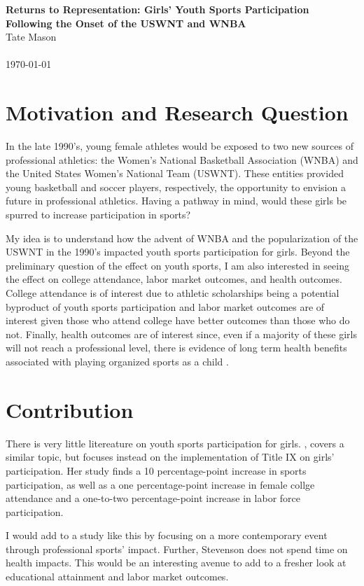 \documentclass[11pt]{article}
\newcommand{\Title}{Returns to Representation: Girls' Youth Sports Participation Following the Onset of the USWNT and WNBA}
\newcommand{\Author}{Tate Mason}
\newcommand{\Date}{\today}
\newcommand{\Section}[1]{\section{#1}}
\newcommand{\1}[1]{\mathbb{I}\{#1\}}
\theoremstyle{plain}
\begin{document}
\begin{center}
  {\large \textbf{\Title}}\\[0.5em]
  {\large \Author}\\
  {\Affil}\\[0.25em]
  {\Date}
\end{center}

\vspace{0.5em}

\Section{Motivation and Research Question}
  In the late 1990's, young female athletes would be exposed to two new sources of professional athletics:
  the Women's National Basketball Association (WNBA) and the United States Women's National Team (USWNT).
  These entities provided young basketball and soccer players, respectively, the opportunity to envision
  a future in professional athletics. Having a pathway in mind, would these girls be spurred to increase
  participation in sports?

  My idea is to understand how the advent of WNBA and the popularization of the USWNT in the 1990's impacted 
  youth sports participation for girls. Beyond the preliminary question of the effect on youth sports, I am also
  interested in seeing the effect on college attendance, labor market outcomes, and health outcomes. College 
  attendance is of interest due to athletic scholarships being a potential byproduct of youth sports participation
  and labor market outcomes are of interest given those who attend college have better outcomes than those who do not.
  Finally, health outcomes are of interest since, even if a majority of these girls will not reach a professional level,
  there is evidence of long term health benefits associated with playing organized sports as a child \parencite{logan_youth_2020}.

\Section{Contribution}
  There is very little litereature on youth sports participation for girls. \textcite{stevenson_beyond_nodate}, covers a similar
  topic, but focuses instead on the implementation of Title IX on girls' participation. Her study finds a 10 percentage-point increase
  in sports participation, as well as a one percentage-point increase in female collge attendance and a one-to-two percentage-point increase
  in labor force participation.

  I would add to a study like this by focusing on a more contemporary event through professional sports' impact. Further, Stevenson does not
  spend time on health impacts. This would be an interesting avenue to add to a fresher look at educational attainment and labor market outcomes.
\end{document}
